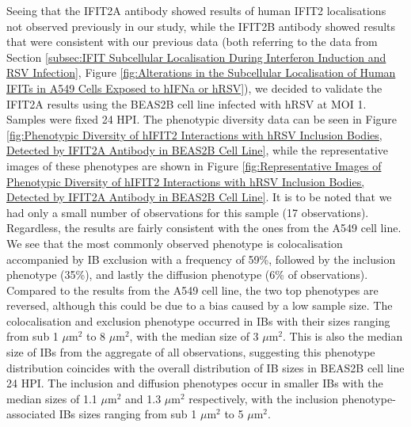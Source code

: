 Seeing that the IFIT2A antibody showed results of human IFIT2 localisations not observed previously in our study, while the IFIT2B antibody showed results that were consistent with our previous data (both referring to the data from Section \ref{subsec:IFIT Subcellular Localisation During Interferon Induction and RSV Infection}, Figure \ref{fig:Alterations in the Subcellular Localisation of Human IFITs in A549 Cells Exposed to hIFNa or hRSV}), we decided to validate the IFIT2A results using the BEAS2B cell line infected with hRSV at MOI 1. Samples were fixed 24 HPI. The phenotypic diversity data can be seen in Figure \ref{fig:Phenotypic Diversity of hIFIT2 Interactions with hRSV Inclusion Bodies, Detected by IFIT2A Antibody in BEAS2B Cell Line}, while the representative images of these phenotypes are shown in Figure \ref{fig:Representative Images of Phenotypic Diversity of hIFIT2 Interactions with hRSV Inclusion Bodies, Detected by IFIT2A Antibody in BEAS2B Cell Line}. It is to be noted that we had only a small number of observations for this sample (17 observations). Regardless, the results are fairly consistent with the ones from the A549 cell line. We see that the most commonly observed phenotype is colocalisation accompanied by IB exclusion with a frequency of 59\%, followed by the inclusion phenotype (35\%), and lastly the diffusion phenotype (6\% of observations). Compared to the results from the A549 cell line, the two top phenotypes are reversed, although this could be due to a bias caused by a low sample size. The colocalisation and exclusion phenotype occurred in IBs with their sizes ranging from sub 1 \(\mu \mbox{m}^2\) to 8 \(\mu \mbox{m}^2\), with the median size of 3 \(\mu \mbox{m}^2\). This is also the median size of IBs from the aggregate of all observations, suggesting this phenotype distribution coincides with the overall distribution of IB sizes in BEAS2B cell line 24 HPI. The inclusion and diffusion phenotypes occur in smaller IBs with the median sizes of 1.1 \(\mu \mbox{m}^2\) and 1.3 \(\mu \mbox{m}^2\) respectively, with the inclusion phenotype-associated IBs sizes ranging from sub 1 \(\mu \mbox{m}^2\) to 5 \(\mu \mbox{m}^2\).

